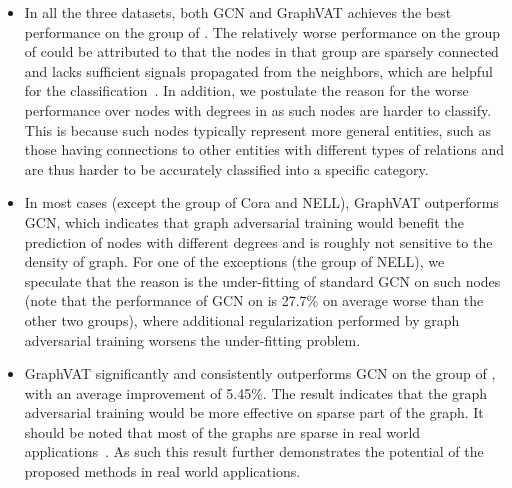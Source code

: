 \documentclass[10pt,journal,compsoc]{IEEEtran}
\begin{document}
\begin{itemize}[leftmargin=*]
\item In all the three datasets, both GCN and GraphVAT achieves the best performance on the group of . The relatively worse performance on the group of  could be attributed to that the nodes in that group are sparsely connected and lacks sufficient signals propagated from the neighbors, which are helpful for the classification~\cite{zhu2003semi,kipf2017semi,gao2018large}. In addition, we postulate the reason for the worse performance over nodes with degrees in  as such nodes are harder to classify. This is because such nodes typically represent more general entities, such as those having connections to other entities with different types of relations and are thus harder to be accurately classified into a specific category.
\item In most cases (except the  group of Cora and NELL), GraphVAT outperforms GCN, which indicates that graph adversarial training would benefit the prediction of nodes with different degrees and is roughly not sensitive to the density of graph. For one of the exceptions (the  group of NELL), we speculate that the reason is the under-fitting of standard GCN on such nodes (note that the performance of GCN on  is 27.7\% on average worse than the other two groups), where additional regularization performed by graph adversarial training worsens the under-fitting problem. 

	\item GraphVAT significantly and consistently outperforms GCN on the group of , with an average improvement of 5.45\%. The result indicates that the graph adversarial training would be more effective on sparse part of the graph. It should be noted that most of the graphs are sparse in real world applications~\cite{cui2018survey}. As such this result further demonstrates the potential of the proposed methods in real world applications.
	
\end{itemize}
\end{document}
